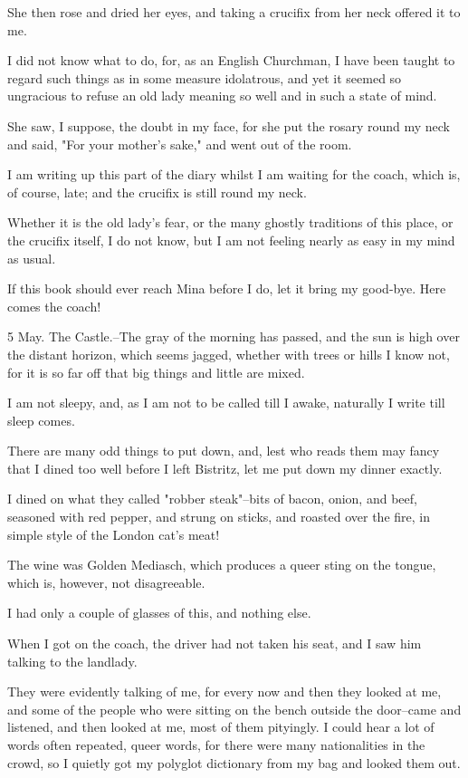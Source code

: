 She then rose and dried her eyes, and taking a crucifix from her neck offered it to me. 

I did not know what to do, for, as an English Churchman, I have been taught to regard such things as in some measure idolatrous, and yet it seemed so ungracious to refuse an old lady meaning so well and in such a state of mind. 

She saw, I suppose, the doubt in my face, for she put the rosary round my neck and said, "For your mother's sake," and went out of the room. 

I am writing up this part of the diary whilst I am waiting for the coach, which is, of course, late; and the crucifix is still round my neck. 

Whether it is the old lady's fear, or the many ghostly traditions of this place, or the crucifix itself, I do not know, but I am not feeling nearly as easy in my mind as usual. 

If this book should ever reach Mina before I do, let it bring my good-bye. Here comes the coach! 

5 May. The Castle.--The gray of the morning has passed, and the sun is high over the distant horizon, which seems jagged, whether with trees or hills I know not, for it is so far off that big things and little are mixed. 

I am not sleepy, and, as I am not to be called till I awake, naturally I write till sleep comes. 

There are many odd things to put down, and, lest who reads them may fancy that I dined too well before I left Bistritz, let me put down my dinner exactly. 

I dined on what they called "robber steak"--bits of bacon, onion, and beef, seasoned with red pepper, and strung on sticks, and roasted over the fire, in simple style of the London cat's meat! 

The wine was Golden Mediasch, which produces a queer sting on the tongue, which is, however, not disagreeable. 

I had only a couple of glasses of this, and nothing else. 

When I got on the coach, the driver had not taken his seat, and I saw him talking to the landlady. 

They were evidently talking of me, for every now and then they looked at me, and some of the people who were sitting on the bench outside the door--came and listened, and then looked at me, most of them pityingly. I could hear a lot of words often repeated, queer words, for there were many nationalities in the crowd, so I quietly got my polyglot dictionary from my bag and looked them out. 

